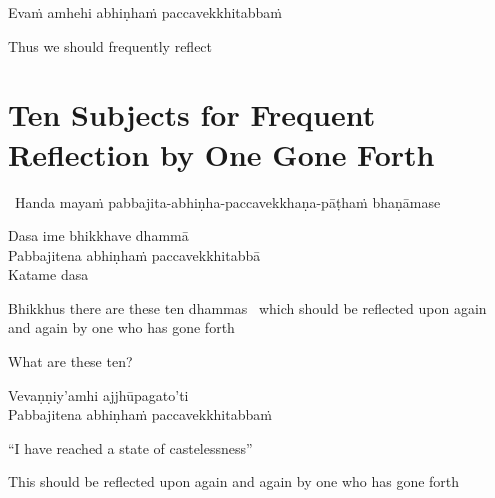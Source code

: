Evaṁ amhehi abhiṇhaṁ paccavekkhitabbaṁ

\begin{english}
  Thus we should frequently reflect\makeatletter\hyperlink{endnote146-appendix}\makeatother
\end{english}

\suttaRef{[AN 5.57]}


\section{Ten Subjects for Frequent Reflection by One Gone Forth}
\label{ten-reflections}

\begin{leader}
  \anglebracketleft\ \hspace{-0.5mm}Handa mayaṁ pabbajita-abhiṇha-paccavekkhaṇa-pāṭhaṁ bhaṇāmase \hspace{-0.5mm}\anglebracketright\
\end{leader}

Dasa ime bhikkhave dhammā\\
Pabbajitena abhiṇhaṁ paccavekkhitabbā\\
Katame dasa

\begin{english-hang-verses}
  Bhikkhus there are these ten dhammas\makeatletter\hyperlink{endnote99-appendix}\makeatother
  \breathmark\ which should be reflected upon again and again by one who has gone forth\\
\end{english-hang-verses}

\begin{english}
  What are these ten?
\end{english}

Vevaṇṇiy'amhi ajjhūpagato'ti\\
Pabbajitena abhiṇhaṁ paccavekkhitabbaṁ

\begin{english-verses}
  ``I have reached a state of castelessness''\makeatletter\hyperlink{endnote100-appendix}\makeatother
  \begin{english-hangtogether-verses}
    This should be reflected upon again and again by one who has gone forth
  \end{english-hangtogether-verses}
\end{english-verses}

